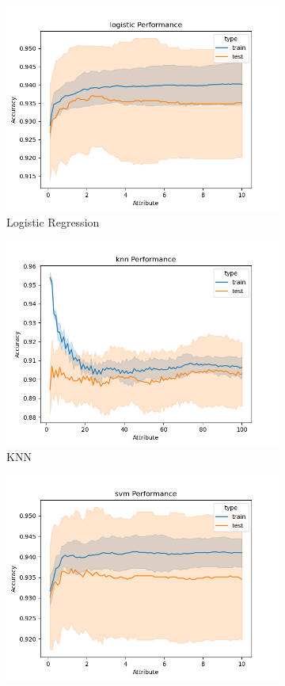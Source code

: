 \documentclass[12pt]{article}
\begin{document}
\begin{figure}
  \begin{subfigure}{.5\textwidth}
  \includegraphics[width=.95\textwidth]{../results/logistic_Performance.png}
    \caption{Logistic Regression}
    \end{subfigure}%
  \begin{subfigure}{.5\textwidth}
    \includegraphics[width=.95\textwidth]{../results/knn_Performance.png}
    \caption{KNN}
    \end{subfigure}
  \begin{subfigure}{.5\textwidth}
    \includegraphics[width=.95\textwidth]{../results/svm_Performance.png}

\end{subfigure}
\end{figure}
\end{document}
